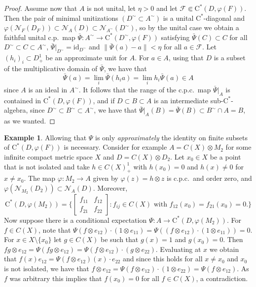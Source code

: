 \documentclass[11pt,a4paper]{amsart}
\theoremstyle{definition}
\newtheorem{example}[theorem]{Example}
\numberwithin{equation}{section}
\newcommand{\mc}[1]{\mathcal{#1}}
\begin{document}
\begin{proof}
Assume now that $A$ is not unital, let $\eta>0$ and let $\mathcal{F}\Subset\mathrm{C}^\ast(D,\varphi(F))$. Then the pair of minimal unitizations $(D^\sim\subset A^\sim)$ is a unital $\mathrm{C}^\ast$-diagonal and $\varphi(\mc{N}_F(D_F))\subset\mc{N}_A(D)\subset\mc{N}_{A^\sim}(D^\sim)$, so by the unital case we obtain a faithful unital c.p.\ map $\bar\Psi\colon A^\sim\to\mathrm{C}^\ast(D^\sim,\varphi(F))$ satisfying $\bar\Psi(C)\subset C$ for all $D^\sim\subset C\subset A^\sim$, $\bar\Psi\vert_{D^\sim}=\mathrm{id}_{D^\sim}$ and $\|\bar\Psi(a)-a\|<\eta$ for all $a\in\mathcal{F}$. Let $(h_i)_i\subset D_+^1$ be an approximate unit for $A$. For $a\in A$, using that $D$ is a subset of the multiplicative domain of $\bar\Psi$, we have that
\[
\bar\Psi(a)=\lim_i\bar\Psi(h_ia)=\lim_ih_i\bar\Psi(a)\in A
\]
since $A$ is an ideal in $A^\sim$. It follows that the range of the c.p.c.\ map $\bar\Psi\vert_A$ is contained in $\mathrm{C}^\ast(D,\varphi(F))$, and if $D\subset B\subset A$ is an intermediate sub-$\mathrm{C}^\ast$-algebra, since $D^\sim\subset B^\sim\subset A^\sim$, we have that $\bar\Psi\vert_A(B) =\bar\Psi(B)\subset B^\sim \cap A=B$, as we wanted.
\end{proof}


 
\begin{example}
Allowing that $\Psi$ is only \emph{approximately} the identity on finite subsets of $\mathrm{C}^\ast(D,\varphi(F))$ is necessary. Consider for example $A=C(X)\otimes M_2$ for some infinite compact metric space $X$ and $D=C(X)\otimes D_2$. Let $x_0\in X$ be a point that is not isolated and take $h\in C(X)_+^1$ with $h(x_0)=0$ and $h(x)\ne0$ for $x\ne x_0$. The map $\varphi\colon M_2\to A$ given by $\varphi(z)=h\otimes z$ is c.p.c.\ and order zero, and $\varphi(\mc{N}_{M_2}(D_2))\subset\mc{N}_A(D)$. Moreover,
\[
\mathrm{C}^\ast(D,\varphi(M_2)) = \bigg\{\begin{bmatrix}f_{11}& f_{12}\\ f_{21} & f_{22}\end{bmatrix}: f_{ij}\in C(X) \text{ with }f_{12}(x_0)=f_{21}(x_0)=0.\bigg\}
\]
Now suppose there is a conditional expectation $\Psi\colon A\to \mathrm{C}^\ast(D,\varphi(M_2))$. For $f\in C(X)$, note that $\Psi(f\otimes e_{12})\cdot (1\otimes e_{11})= \Psi((f\otimes e_{12})\cdot(1\otimes e_{11}))=0$. For $x\in X\setminus\{x_0\}$ let $g\in C(X)$ be such that $g(x)=1$ and $g(x_0)=0$. Then $fg\otimes e_{12} = \Psi(fg\otimes e_{12}) = \Psi(f\otimes e_{12})\cdot (g\otimes e_{22})$. Evaluating at $x$ we obtain that $f(x)e_{12}=\Psi(f\otimes e_{12})(x)\cdot e_{22}$ and since this holds for all $x\ne x_0$ and $x_0$ is not isolated, we have that $f\otimes e_{12} = \Psi(f\otimes e_{12})\cdot (1\otimes e_{22})=\Psi(f\otimes e_{12})$. As $f$ was arbitrary this implies that $f(x_0)=0$ for all $f\in C(X)$, a contradiction.
\end{example}
\end{document}

